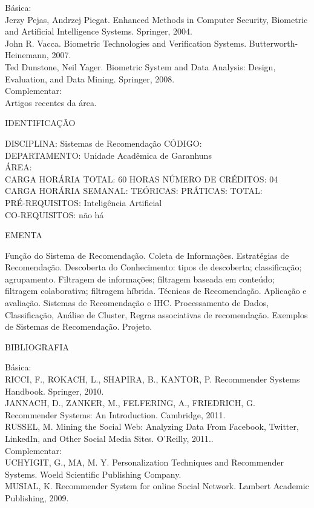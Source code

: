 \documentclass[
	12pt,				%
	openright,			%
  oneside,     %
	a4paper,			%
	chapter=TITLE,		%
	english,			%
	french,				%
	spanish,			%
	brazil				%
	]{abntex2}
\begin{document}
\begin{apendicesenv}
Básica:\\
Jerzy Pejas, Andrzej Piegat. Enhanced Methods in Computer Security,
Biometric and Artificial Intelligence Systems. Springer, 2004.\\
John R. Vacca. Biometric Technologies and Verification Systems.
Butterworth-Heinemann, 2007.
\\Ted Dunstone, Neil Yager. Biometric System and Data Analysis: Design,
Evaluation, and Data Mining. Springer, 2008.\\
Complementar:\\
Artigos recentes da área.

\newpage IDENTIFICAÇÃO

DISCIPLINA: Sistemas de Recomendação CÓDIGO:\\ 
DEPARTAMENTO: Unidade Acadêmica de Garanhuns\\
ÁREA: \\
CARGA HORÁRIA TOTAL: 60 HORAS NÚMERO DE CRÉDITOS: 04\\
CARGA HORÁRIA SEMANAL: TEÓRICAS: PRÁTICAS: TOTAL: \\
PRÉ-REQUISITOS: Inteligência Artificial\\
CO-REQUISITOS: não há

EMENTA 

Função do Sistema de Recomendação. Coleta de Informações. Estratégias de
Recomendação. Descoberta do Conhecimento: tipos de descoberta;
classificação; agrupamento. Filtragem de informações; filtragem baseada
em conteúdo; filtragem colaborativa; filtragem híbrida. Técnicas de
Recomendação. Aplicação e avaliação. Sistemas de Recomendação e IHC.
Processamento de Dados, Classificação, Análise de Cluster, Regras
associativas de recomendação. Exemplos de Sistemas de Recomendação.
Projeto.

BIBLIOGRAFIA 

Básica:\\
RICCI, F., ROKACH, L., SHAPIRA, B., KANTOR, P. Recommender Systems
Handbook. Springer, 2010.\\JANNACH, D., ZANKER, M., FELFERING, A., FRIEDRICH, G. Recommender
Systems: An Introduction. Cambridge, 2011.\\RUSSEL, M. Mining the Social Web: Analyzing Data From Facebook, Twitter,
LinkedIn, and Other Social Media Sites. O'Reilly,
2011..\\
Complementar:\\
UCHYIGIT, G., MA, M. Y. Personalization Techniques and Recommender
Systems. Woeld Scientific Publishing Company.\\MUSIAL, K. Recommender System for online Social Network. Lambert
Academic Publishing, 2009.


\end{apendicesenv}
\end{document}
